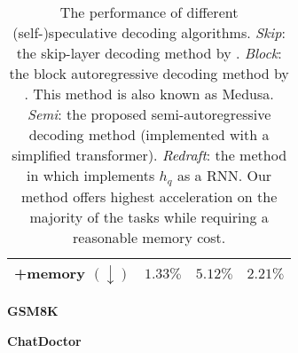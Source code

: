 \begin{table}[t]
\begin{subtable}{.5\linewidth}
{\begin{tabular}{lccc}
  +memory $(\downarrow)$ & $1.33\%$ & $5.12\%$ & $2.21\%$  \\
    \bottomrule
  \end{tabular}
  }
   \caption{\textbf{GSM8K}}
\end{subtable}
\begin{subtable}{.5\linewidth}
   \caption{\textbf{ChatDoctor}}
\end{subtable}
\caption{The performance of different (self-)speculative decoding algorithms. \emph{Skip}: the skip-layer decoding method by \citep{elhoushi-etal-2024-layerskip}. \emph{Block}: the block autoregressive decoding method by \citep{cai2024medusa}. This method is also known as Medusa. \emph{Semi}: the proposed semi-autoregressive decoding method (implemented with a simplified transformer). \emph{Redraft}: the method in \citep{zhang2024recurrent} which implements $h_q$ as a RNN. Our method offers highest acceleration on the majority of the tasks while requiring a reasonable memory cost. }
\label{tab:main-comparison-table}
\end{table}
